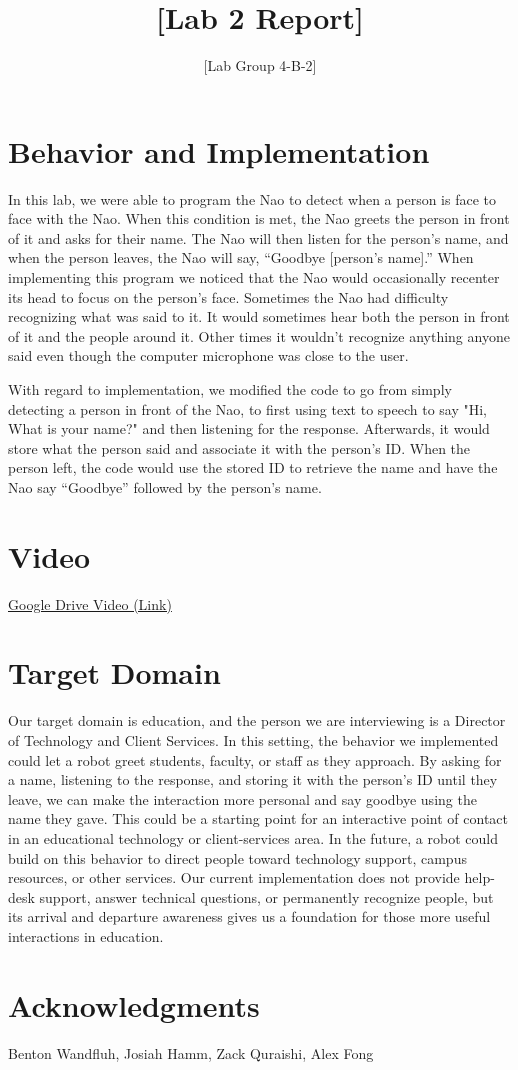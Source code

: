 \documentclass{article}
\title{[Lab 2 Report]}
\author{[Lab Group 4-B-2]}
\begin{document}
\maketitle

\section*{Behavior and Implementation}
In this lab, we were able to program the Nao to detect when a person is face to face with the Nao. When this condition is met, the Nao greets the person in front of it and asks for their name. The Nao will then listen for the person's name, and when the person leaves, the Nao will say, ``Goodbye [person's name].'' When implementing this program we noticed that the Nao would occasionally recenter its head to focus on the person's face. Sometimes the Nao had difficulty recognizing what was said to it. It would sometimes hear both the person in front of it and the people around it. Other times it wouldn't recognize anything anyone said even though the computer microphone was close to the user.

With regard to implementation, we modified the code to go from simply detecting a person in front of the Nao, to first using text to speech to say "Hi, What is your name?" and then listening for the response. Afterwards, it would store what the person said and associate it with the person's ID. When the person left, the code would use the stored ID to retrieve the name and have the Nao say ``Goodbye'' followed by the person's name.

\section*{Video}

\href{https://drive.google.com/file/d/1voXI5RSA33lW0K4403GzudLtSK6N_Pdn/view?usp=sharing}{Google Drive Video (Link)}

\section*{Target Domain}

Our target domain is education, and the person we are interviewing is a Director of Technology and Client Services. In this setting, the behavior we implemented could let a robot greet students, faculty, or staff as they approach. By asking for a name, listening to the response, and storing it with the person's ID until they leave, we can make the interaction more personal and say goodbye using the name they gave. This could be a starting point for an interactive point of contact in an educational technology or client-services area. In the future, a robot could build on this behavior to direct people toward technology support, campus resources, or other services. Our current implementation does not provide help-desk support, answer technical questions, or permanently recognize people, but its arrival and departure awareness gives us a foundation for those more useful interactions in education.


\section*{Acknowledgments}
Benton Wandfluh, Josiah Hamm, Zack Quraishi, Alex Fong
\end{document}
